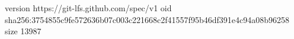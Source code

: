 version https://git-lfs.github.com/spec/v1
oid sha256:3754855c9fe572636b07c003c221668c2f41557f95b46df391e4c94a08b96258
size 13987
